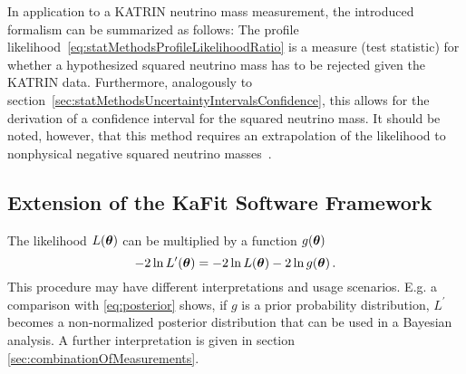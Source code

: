 In application to a KATRIN neutrino mass measurement, the introduced formalism can be summarized as follows: The profile likelihood~\eqref{eq:statMethodsProfileLikelihoodRatio} is a measure (test statistic) for whether a hypothesized squared neutrino mass has to be rejected given the KATRIN data. Furthermore, analogously to section~\ref{sec:statMethodsUncertaintyIntervalsConfidence}, this allows for the derivation of a confidence interval for the squared neutrino mass. It should be noted, however, that this method requires an extrapolation of the likelihood to nonphysical negative squared neutrino masses~\cite{Kleesiek2014}.

\subsection{Extension of the KaFit Software Framework}
\label{sec:katrinElossStatisticsImplementation}
The likelihood $L(\boldsymbol{\mathbf{\theta}})$ can be multiplied by a function $g(\boldsymbol{\mathbf{\theta}})$
\begin{equation}
\label{eq:likelihoodExtension}
-2\ln L^\prime(\boldsymbol{\mathbf{\theta}}) = -2\ln L(\boldsymbol{\mathbf{\theta}}) -2\ln g(\boldsymbol{\mathbf{\theta}})
\text{\,.}
\end{equation}
This procedure may have different interpretations and usage scenarios. E.g. a comparison with \eqref{eq:posterior} shows, if $g$ is a prior probability distribution, $L^\prime$ becomes a non-normalized posterior distribution that can be used in a Bayesian analysis. A further interpretation is given in section \ref{sec:combinationOfMeasurements}.
\label{sec:combinationOfMeasurements}

